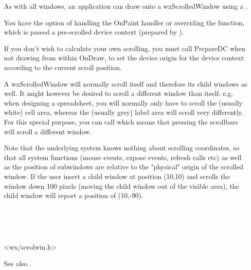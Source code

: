 As with all windows, an application can draw onto a wxScrolledWindow using
a .

You have the option of handling the OnPaint handler
or overriding the  function, which is passed
a pre-scrolled device context (prepared by ).

If you don't wish to calculate your own scrolling, you must call PrepareDC when not drawing from
within OnDraw, to set the device origin for the device context according to the current
scroll position.

A wxScrolledWindow will normally scroll itself and therefore its child windows as well. It
might however be desired to scroll a different window than itself: e.g. when designing a
spreadsheet, you will normally only have to scroll the (usually white) cell area, whereas the
(usually grey) label area will scroll very differently. For this special purpose, you can
call  which means that pressing
the scrollbars will scroll a different window.

Note that the underlying system knows nothing about scrolling coordinates, so that all system
functions (mouse events, expose events, refresh calls etc) as well as the position of subwindows
are relative to the "physical" origin of the scrolled window. If the user insert a child window at
position (10,10) and scrolls the window down 100 pixels (moving the child window out of the visible
area), the child window will report a position of (10,-90).



\\
\\
\\


<wx/scrolwin.h>


\twocolwidtha{5cm}
\begin{twocollist}\itemsep=0pt
\end{twocollist}

See also .

